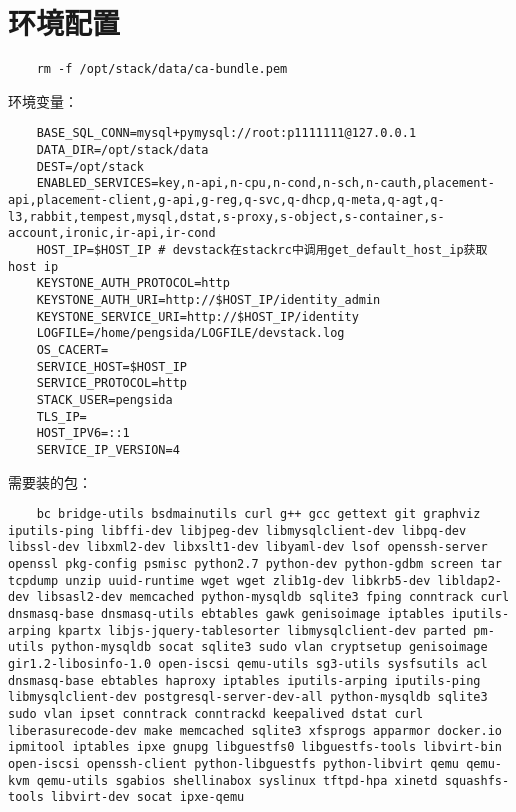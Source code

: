 \documentclass[a4paper,left=1.5cm,right=1.5cm,11pt]{article}
\begin{document}
\tableofcontents

\clearpage

\section{环境配置}
	\begin{lstlisting}
	rm -f /opt/stack/data/ca-bundle.pem
	\end{lstlisting}

	环境变量：
	\begin{lstlisting}
	BASE_SQL_CONN=mysql+pymysql://root:p1111111@127.0.0.1
	DATA_DIR=/opt/stack/data
	DEST=/opt/stack
	ENABLED_SERVICES=key,n-api,n-cpu,n-cond,n-sch,n-cauth,placement-api,placement-client,g-api,g-reg,q-svc,q-dhcp,q-meta,q-agt,q-l3,rabbit,tempest,mysql,dstat,s-proxy,s-object,s-container,s-account,ironic,ir-api,ir-cond
	HOST_IP=$HOST_IP # devstack在stackrc中调用get_default_host_ip获取host ip
	KEYSTONE_AUTH_PROTOCOL=http
	KEYSTONE_AUTH_URI=http://$HOST_IP/identity_admin
	KEYSTONE_SERVICE_URI=http://$HOST_IP/identity
	LOGFILE=/home/pengsida/LOGFILE/devstack.log
	OS_CACERT=
	SERVICE_HOST=$HOST_IP
	SERVICE_PROTOCOL=http
	STACK_USER=pengsida
	TLS_IP=
	HOST_IPV6=::1
	SERVICE_IP_VERSION=4
	\end{lstlisting}

	需要装的包：
	\begin{lstlisting}
	bc bridge-utils bsdmainutils curl g++ gcc gettext git graphviz iputils-ping libffi-dev libjpeg-dev libmysqlclient-dev libpq-dev libssl-dev libxml2-dev libxslt1-dev libyaml-dev lsof openssh-server openssl pkg-config psmisc python2.7 python-dev python-gdbm screen tar tcpdump unzip uuid-runtime wget wget zlib1g-dev libkrb5-dev libldap2-dev libsasl2-dev memcached python-mysqldb sqlite3 fping conntrack curl dnsmasq-base dnsmasq-utils ebtables gawk genisoimage iptables iputils-arping kpartx libjs-jquery-tablesorter libmysqlclient-dev parted pm-utils python-mysqldb socat sqlite3 sudo vlan cryptsetup genisoimage gir1.2-libosinfo-1.0 open-iscsi qemu-utils sg3-utils sysfsutils acl dnsmasq-base ebtables haproxy iptables iputils-arping iputils-ping libmysqlclient-dev postgresql-server-dev-all python-mysqldb sqlite3 sudo vlan ipset conntrack conntrackd keepalived dstat curl liberasurecode-dev make memcached sqlite3 xfsprogs apparmor docker.io ipmitool iptables ipxe gnupg libguestfs0 libguestfs-tools libvirt-bin open-iscsi openssh-client python-libguestfs python-libvirt qemu qemu-kvm qemu-utils sgabios shellinabox syslinux tftpd-hpa xinetd squashfs-tools libvirt-dev socat ipxe-qemu
	\end{lstlisting}
\end{document}
